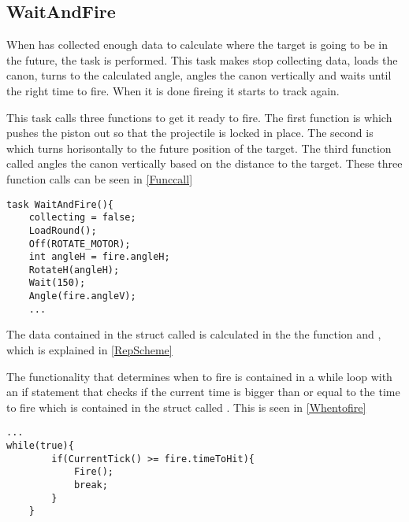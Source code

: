 \subsection{WaitAndFire}
When \name has collected enough data to calculate where the target is going to
be in the future, the task  is performed. This task makes
\name stop collecting data, loads the canon, turns to the calculated angle, angles the
canon vertically and waits until the right time to fire. When it is done fireing
it starts to track again.\nl

This task calls three functions to get it ready to fire. The first function is
 which pushes the piston out so that the projectile is locked
in place. The second is  which turns \name horisontally to the
future position of the target. The third function called  angles
the canon vertically based on the distance to the target. These three function calls can be seen in
\autoref{Funccall}\nl

\begin{minipage}[H]{\linewidth}
\begin{lstlisting}[caption = Function calls in WaitAndFire, label = Funccall] 
task WaitAndFire(){
    collecting = false;
    LoadRound();
    Off(ROTATE_MOTOR);
    int angleH = fire.angleH;
    RotateH(angleH);
    Wait(150);
    Angle(fire.angleV);
    ...
\end{lstlisting}
\end{minipage}

The data contained in the struct called  is calculated in the the
function  and , which is explained in
\autoref{RepScheme}

The functionality that determines when to fire is contained in a while loop with
an if statement that checks if the current time is bigger than or equal to the
time to fire which is contained in the struct called . This is seen
in \autoref{Whentofire}\nl
 
\begin{minipage}[H]{\linewidth}
\begin{lstlisting}[caption = While loop that determines when to fire, label =
Whentofire]
 ...
while(true){
        if(CurrentTick() >= fire.timeToHit){
            Fire();
            break;
        }
    }
\end{lstlisting}
\end{minipage}





